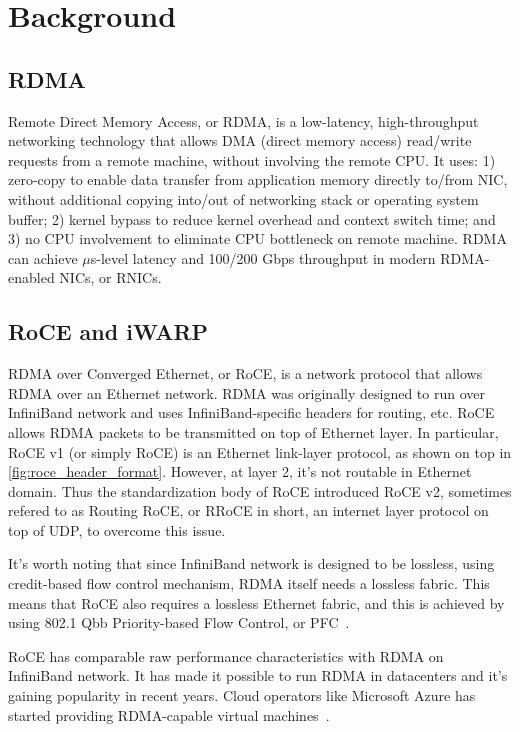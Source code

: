 \section{Background}
\label{sec:background}

\subsection{RDMA}

Remote Direct Memory Access, or RDMA, is a low-latency, high-throughput networking technology that allows DMA (direct memory access)
read/write requests from a remote machine, without involving the remote CPU. It uses: 1) zero-copy to enable data transfer from application memory
directly to/from NIC, without additional copying into/out of networking stack or operating system buffer; 2) kernel bypass to reduce kernel overhead
and context switch time; and 3) no CPU involvement to eliminate CPU bottleneck on remote machine. RDMA can achieve $\mu$s-level latency and 100/200 Gbps
throughput in modern RDMA-enabled NICs, or RNICs.

\subsection{RoCE and iWARP}

RDMA over Converged Ethernet, or RoCE, is a network protocol that allows RDMA over an Ethernet network.
RDMA was originally designed to run over InfiniBand network and uses InfiniBand-specific headers for routing, etc.
RoCE allows RDMA packets to be transmitted on top of Ethernet layer. In particular, RoCE v1 (or simply RoCE) is an Ethernet link-layer protocol,
as shown on top in \autoref{fig:roce_header_format}. However, at layer 2, it's not routable in Ethernet domain. Thus the standardization body of
RoCE introduced RoCE v2, sometimes refered to as Routing RoCE, or RRoCE in short, an internet layer protocol on top of UDP, to overcome this issue.

It's worth noting that since InfiniBand network is designed to be lossless, using credit-based flow control mechanism, RDMA itself needs a lossless
fabric. This means that RoCE also requires a lossless Ethernet fabric, and this is achieved by using 802.1 Qbb Priority-based Flow Control,
or PFC~\cite{802.1qbb}.

RoCE has comparable raw performance characteristics with RDMA on InfiniBand network. It has made it possible to run RDMA in datacenters
and it's gaining popularity in recent years. Cloud operators like Microsoft Azure has started providing RDMA-capable virtual machines~\cite{news:azure.rdma}.

